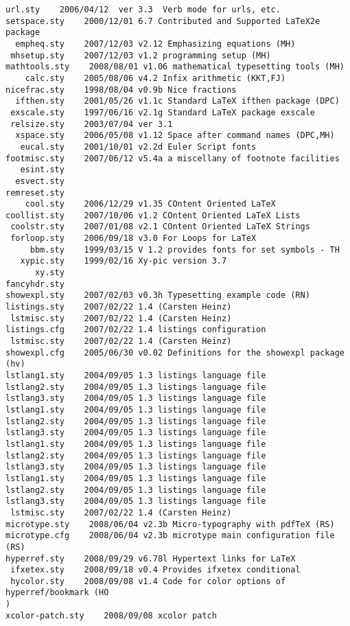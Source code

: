 \begin{table}[htb]
\begin{lstlisting}[breaklines,xrightmargin=-\marginparwidth]
     url.sty    2006/04/12  ver 3.3  Verb mode for urls, etc.
setspace.sty    2000/12/01 6.7 Contributed and Supported LaTeX2e package
  empheq.sty    2007/12/03 v2.12 Emphasizing equations (MH)
 mhsetup.sty    2007/12/03 v1.2 programming setup (MH)
mathtools.sty    2008/08/01 v1.06 mathematical typesetting tools (MH)
    calc.sty    2005/08/06 v4.2 Infix arithmetic (KKT,FJ)
nicefrac.sty    1998/08/04 v0.9b Nice fractions
  ifthen.sty    2001/05/26 v1.1c Standard LaTeX ifthen package (DPC)
 exscale.sty    1997/06/16 v2.1g Standard LaTeX package exscale
 relsize.sty    2003/07/04 ver 3.1
  xspace.sty    2006/05/08 v1.12 Space after command names (DPC,MH)
   eucal.sty    2001/10/01 v2.2d Euler Script fonts
footmisc.sty    2007/06/12 v5.4a a miscellany of footnote facilities
   esint.sty    
  esvect.sty    
remreset.sty    
    cool.sty    2006/12/29 v1.35 COntent Oriented LaTeX
coollist.sty    2007/10/06 v1.2 COntent Oriented LaTeX Lists
 coolstr.sty    2007/01/08 v2.1 COntent Oriented LaTeX Strings
 forloop.sty    2006/09/18 v3.0 For Loops for LaTeX
     bbm.sty    1999/03/15 V 1.2 provides fonts for set symbols - TH
   xypic.sty    1999/02/16 Xy-pic version 3.7
      xy.sty
fancyhdr.sty    
showexpl.sty    2007/02/03 v0.3h Typesetting example code (RN)
listings.sty    2007/02/22 1.4 (Carsten Heinz)
 lstmisc.sty    2007/02/22 1.4 (Carsten Heinz)
listings.cfg    2007/02/22 1.4 listings configuration
 lstmisc.sty    2007/02/22 1.4 (Carsten Heinz)
showexpl.cfg    2005/06/30 v0.02 Definitions for the showexpl package (hv)
lstlang1.sty    2004/09/05 1.3 listings language file
lstlang2.sty    2004/09/05 1.3 listings language file
lstlang3.sty    2004/09/05 1.3 listings language file
lstlang1.sty    2004/09/05 1.3 listings language file
lstlang2.sty    2004/09/05 1.3 listings language file
lstlang3.sty    2004/09/05 1.3 listings language file
lstlang1.sty    2004/09/05 1.3 listings language file
lstlang2.sty    2004/09/05 1.3 listings language file
lstlang3.sty    2004/09/05 1.3 listings language file
lstlang1.sty    2004/09/05 1.3 listings language file
lstlang2.sty    2004/09/05 1.3 listings language file
lstlang3.sty    2004/09/05 1.3 listings language file
 lstmisc.sty    2007/02/22 1.4 (Carsten Heinz)
microtype.sty    2008/06/04 v2.3b Micro-typography with pdfTeX (RS)
microtype.cfg    2008/06/04 v2.3b microtype main configuration file (RS)
hyperref.sty    2008/09/29 v6.78l Hypertext links for LaTeX
 ifxetex.sty    2008/09/18 v0.4 Provides ifxetex conditional
 hycolor.sty    2008/09/08 v1.4 Code for color options of hyperref/bookmark (HO
)
xcolor-patch.sty    2008/09/08 xcolor patch

\end{lstlisting}
\end{table}
